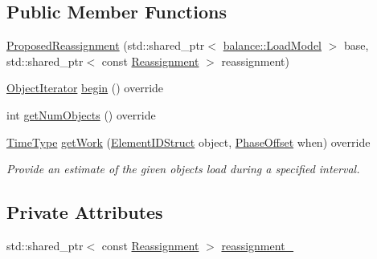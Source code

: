 \subsection*{Public Member Functions}
\begin{DoxyCompactItemize}
\item 
\hyperlink{structvt_1_1vrt_1_1collection_1_1balance_1_1_proposed_reassignment_a8c678464bec1fa46e24c69be66a45220}{Proposed\+Reassignment} (std\+::shared\+\_\+ptr$<$ \hyperlink{structvt_1_1vrt_1_1collection_1_1balance_1_1_load_model}{balance\+::\+Load\+Model} $>$ base, std\+::shared\+\_\+ptr$<$ const \hyperlink{structvt_1_1vrt_1_1collection_1_1balance_1_1_reassignment}{Reassignment} $>$ reassignment)
\item 
\hyperlink{structvt_1_1vrt_1_1collection_1_1balance_1_1_object_iterator}{Object\+Iterator} \hyperlink{structvt_1_1vrt_1_1collection_1_1balance_1_1_proposed_reassignment_aef7e98817093a99fbda1eaae7cb29f79}{begin} () override
\item 
int \hyperlink{structvt_1_1vrt_1_1collection_1_1balance_1_1_proposed_reassignment_ad265d4881094bb11cb538e7340bc8a49}{get\+Num\+Objects} () override
\item 
\hyperlink{namespacevt_a876a9d0cd5a952859c72de8a46881442}{Time\+Type} \hyperlink{structvt_1_1vrt_1_1collection_1_1balance_1_1_proposed_reassignment_ac865e7afd9b830328a31b947aed65f05}{get\+Work} (\hyperlink{namespacevt_1_1vrt_1_1collection_1_1balance_a9f5b53fafb270212279a4757d2c4cd28}{Element\+I\+D\+Struct} object, \hyperlink{structvt_1_1vrt_1_1collection_1_1balance_1_1_phase_offset}{Phase\+Offset} when) override
\begin{DoxyCompactList}\small\item\em Provide an estimate of the given object\textquotesingle{}s load during a specified interval. \end{DoxyCompactList}\end{DoxyCompactItemize}
\subsection*{Private Attributes}
\begin{DoxyCompactItemize}
\item 
std\+::shared\+\_\+ptr$<$ const \hyperlink{structvt_1_1vrt_1_1collection_1_1balance_1_1_reassignment}{Reassignment} $>$ \hyperlink{structvt_1_1vrt_1_1collection_1_1balance_1_1_proposed_reassignment_a923fcc247c401b766417f1e87009cb00}{reassignment\+\_\+}
\end{DoxyCompactItemize}


